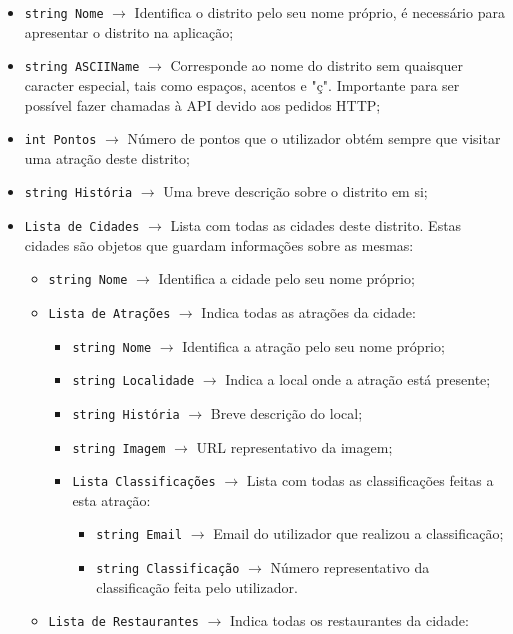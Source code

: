 \begin{itemize}
    \item \texttt{string Nome} $\rightarrow$ Identifica o distrito pelo seu nome próprio, é necessário para apresentar o distrito na aplicação;
    \item \texttt{string ASCIIName} $\rightarrow$ Corresponde ao nome do distrito sem quaisquer caracter especial, tais como espaços, acentos e "ç". Importante para ser possível fazer chamadas à API devido aos pedidos HTTP;
    \item \texttt{int Pontos} $\rightarrow$ Número de pontos que o utilizador obtém sempre que visitar uma atração deste distrito;
    \item \texttt{string História} $\rightarrow$ Uma breve descrição sobre o distrito em si;
    \item \texttt{Lista de Cidades} $\rightarrow$ Lista com todas as cidades deste distrito. Estas cidades são objetos que guardam informações sobre as mesmas:
    \begin{itemize}
        \item \texttt{string Nome} $\rightarrow$ Identifica a cidade pelo seu nome próprio;
        \item \texttt{Lista de Atrações} $\rightarrow$ Indica todas as atrações da cidade:
        \begin{itemize}
            \item \texttt{string Nome} $\rightarrow$ Identifica a atração pelo seu nome próprio;
            \item \texttt{string Localidade} $\rightarrow$ Indica a local onde a atração está presente;
            \item \texttt{string História} $\rightarrow$ Breve descrição do local;
            \item \texttt{string Imagem} $\rightarrow$ URL representativo da imagem;
            \item \texttt{Lista Classificações} $\rightarrow$ Lista com todas as classificações feitas a esta atração:
            \begin{itemize}
            \item \texttt{string Email} $\rightarrow$ Email do utilizador que realizou a classificação;
            \item \texttt{string Classificação} $\rightarrow$ Número representativo da classificação feita pelo utilizador.
        \end{itemize}
        \end{itemize}
        \item \texttt{Lista de Restaurantes} $\rightarrow$ Indica todas os restaurantes da cidade:

\end{itemize}
\end{itemize}
